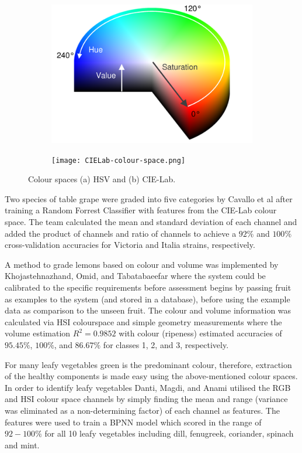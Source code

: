 \documentclass[fleqn,twoside,12pt]{report}
\begin{document}
\begin{figure}[h]
	\centering
	\begin{subfigure}{.5\textwidth}
		\centering
		\includegraphics[width=.7\linewidth]{hue_sat.png}
		\caption{}
		\label{fig:HSV}
	\end{subfigure}%
	\begin{subfigure}{.5\textwidth}
		\centering
		\texttt{[image: CIELab-colour-space.png]}
		\caption{}
		\label{fig:Lab}
	\end{subfigure}%
	\caption{Colour spaces (a) HSV and (b) CIE-Lab.}
	\label{fig:colour-space}
\end{figure}

Two species of table grape were graded into five categories by Cavallo et al \cite{cavallo} after training a Random Forrest Classifier with features from the CIE-Lab colour space. The team calculated the mean and standard deviation of each channel and added the product of channels and ratio of channels to achieve a $92\%$ and $100\%$ cross-validation accuracies for Victoria and Italia strains, respectively.

A method to grade lemons based on colour and volume was implemented by Khojastehnazhand, Omid, and Tabatabaeefar \cite{khojastehnazhand} where the system could be calibrated to the specific requirements before assessment begins by passing fruit as examples to the system (and stored in a database), before using the example data as comparison to the unseen fruit. The colour and volume information was calculated via HSI colourspace and simple geometry measurements where the volume estimation $R^2 = 0.9852$ with colour (ripeness) estimated accuracies of $95.45\%$, $100\%$, and $86.67\%$ for classes 1, 2, and 3, respectively.

For many leafy vegetables green is the predominant colour, therefore, extraction of the healthy components is made easy using the above-mentioned colour spaces. In order to identify leafy vegetables Danti, Magdi, and Anami \cite{danti} utilised the RGB and HSI colour space channels by simply finding the mean and range (variance was eliminated as a non-determining factor) of each channel as features. The features were used to train a BPNN model which scored in the range of $92-100\%$ for all 10 leafy vegetables including dill, fenugreek, coriander, spinach and mint. 
\end{document}
